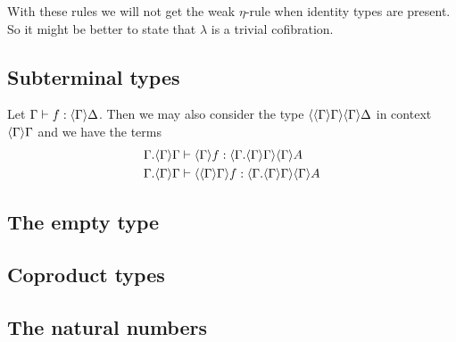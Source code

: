 With these rules we will not get the weak $\eta$-rule when identity types are present.
So it might be better to state that $\lambda$ is a trivial cofibration.

\subsection{Subterminal types}
Let $\jhom{\Gamma}{\Delta}{f}$. Then we may also consider the type $\ctxwk{{\Gamma}{\Gamma}}{{\Gamma}{\Delta}}$
in context $\ctxwk{\Gamma}{\Gamma}$ and we have the terms
\begin{align*}
& \jhom{\ctxext{\Gamma}{\ctxwk{\Gamma}{\Gamma}}}{\ctxwk{\Gamma}{A}}{\ctxwk{\Gamma}{f}}\\
& \jhom{\ctxext{\Gamma}{\ctxwk{\Gamma}{\Gamma}}}{\ctxwk{\Gamma}{A}}{\ctxwk{{\Gamma}{\Gamma}}{f}}
\end{align*}

\subsection{The empty type}

\subsection{Coproduct types}

\subsection{The natural numbers}

